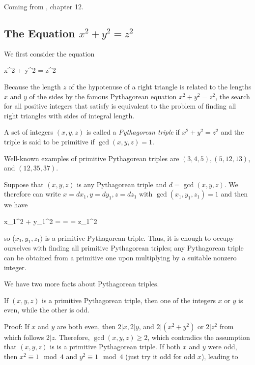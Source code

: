
Coming from \cite{Burton2011}, chapter 12.

\subsection{The Equation $x^2 + y^2 = z^2$}

We first consider the equation

\bee
x^2 + y^2 = z^2
\eee

Because the length $z$ of the hypotenuse of a right triangle is related to the lengths $x$ and $y$ of the sides by the famous Pythagorean equation $x^2 + y^2 = z^2$, the search for all positive integers that satisfy  is equivalent to the problem of finding all right triangles with sides of integral length.

A set of integers $(x,y,z)$ is called a \emph{Pythagorean triple} if $x^2 + y^2 = z^2$ and the triple is said to be primitive if $\gcd(x,y,z) = 1$.

Well-known examples of primitive Pythagorean triples are $(3,4,5), (5, 12, 13)$, and $(12, 35, 37)$.

Suppose that $(x,y,z)$ is any Pythagorean triple and $d = \gcd(x,y,z)$. We therefore can write $x = d x_1, y = d y_1, z = d z_1$ with $\gcd(x_1, y_1, z_1) = 1$ and then we have

\bee
x_1^2 + y_1^2 =  =  = z_1^2
\eee

so ($x_1, y_1, z_1)$ is a primitive Pythagorean triple. Thus, it is enough to occupy ourselves with finding all primitive Pythagorean triples; any Pythagorean triple can be obtained from a primitive one upon multiplying by a suitable nonzero integer.

We have two more facts about Pythagorean triples.

\begin{theorem}\label{2023-03-28:th1}
If $(x, y, z)$ is a primitive Pythagorean triple, then one of the integers $x$ or $y$ is even, while the other is odd.
\end{theorem}

Proof: If $x$ and $y$ are both even, then $2|x, 2|y$, and $2 | (x^2+y^2)$ or $2|z^2$ from which follows $2|z$. Therefore, $\gcd(x,y,z) \geq 2$, which contradics the assumption that $(x,y,z)$ is is a primitive Pythagorean triple. If both $x$ and $y$ were odd, then $x^2 \equiv 1 \mod 4$ and $y^2 \equiv 1 \mod 4$ (just try it odd for odd $x$), leading to

